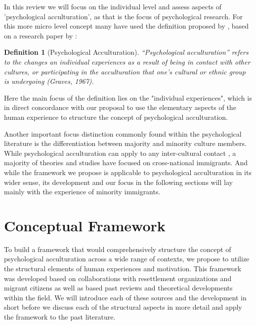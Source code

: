 \documentclass[nobib]{tufte-handout}
\newtheorem{definition}{Definition}
\begin{document}
In this review we will focus on the individual level and assess aspects of 'psychological acculturation', as that is the focus of psychological research. For this more micro level concept many have used the definition proposed by \citet[][p. 14]{Sam2006b}, based on a research paper by \citet{Graves1967}: 
\begin{framed}
    \begin{definition}[Psychological Acculturation]
        “Psychological acculturation” refers to the changes an individual experiences as a result of being in contact with other cultures, or participating in the acculturation that one’s cultural or ethnic group is undergoing (Graves, 1967).
    \end{definition}
\end{framed}
Here the main focus of the definition lies on the "individual experiences", which is in direct concordance with our proposal to use the elementary aspects of the human experience to structure the concept of psychological acculturation.

Another important focus distinction commonly found within the psychological literature is the differentiation between majority and minority culture members. While psychological acculturation can apply to any inter-cultural contact \citep[including, for example the contact between indigenous people and colonial settlers, e.g.,][]{Berry1974}, a majority of theories and studies have focused on cross-national immigrants. And while the framework we propose is applicable to psychological acculturation in its wider sense, its development and our focus in the following sections will lay mainly with the experience of minority immigrants.

\section{Conceptual Framework} 

To build a framework that would comprehensively structure the concept of psychological acculturation across a wide range of contexts, we propose to utilize the structural elements of human experiences and motivation. This framework was developed based on collaborations with resettlement organizations and migrant citizens as well as based past reviews and theoretical developments within the field. We will introduce each of these sources and the development in short before we discuss each of the structural aspects in more detail and apply the framework to the past literature.
\end{document}
